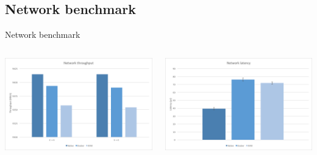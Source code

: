 \subsection{Network benchmark}
\begin{frame}{Network benchmark}
	\begin{columns}
		\begin{column}{0.5\textwidth}
			\centering{}
			\includegraphics[scale=0.27]{images/network-throughput.png}
		\end{column}
		\begin{column}{0.5\textwidth}
			\centering{}
			\includegraphics[scale=0.27]{images/network-latency.png}
		\end{column}
	\end{columns}
\end{frame}